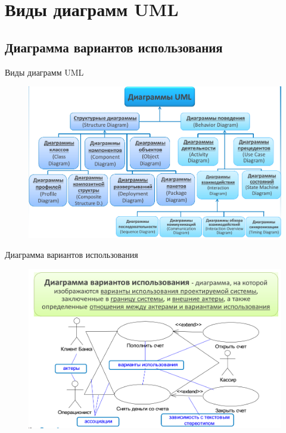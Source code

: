 \documentclass{beamer}
\begin{document}
\section{Виды диаграмм UML}
\subsection{Диаграмма вариантов использования}

\begin{frame}[t]{Виды диаграмм UML}
\begin{figure}[h]
\centering
\includegraphics[scale=0.45]{images/lec03-pic06.png}
\end{figure}
\end{frame}

\begin{frame}[t]{Диаграмма вариантов использования}
\begin{figure}[h]
\centering
\includegraphics[scale=0.45]{images/lec03-pic07.png}
\end{figure}
\end{frame}
\end{document}
